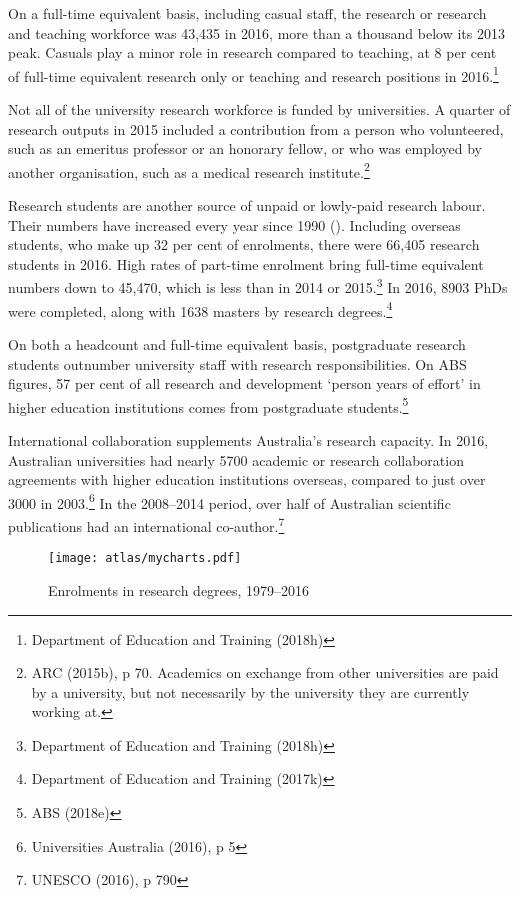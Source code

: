 \documentclass{grattan}
\begin{document}
On a full-time equivalent basis, including casual staff, the research or research and teaching workforce was 43,435 in 2016, more than a thousand below its 2013 peak. Casuals play a minor role in research compared to teaching, at 8 per cent of full-time equivalent research only or teaching and research positions in 2016.\footnote{Department of Education and Training (2018h)}

Not all of the university research workforce is funded by universities. A quarter of research outputs in 2015 included a contribution from a person who volunteered, such as an emeritus professor or an honorary fellow, or who was employed by another organisation, such as a medical research institute.\footnote{ARC (2015b), p 70. Academics on exchange from other universities are paid by a university, but not necessarily by the university they are currently working at.}

Research students are another source of unpaid or lowly-paid research labour. Their numbers have increased every year since 1990 (). Including overseas students, who make up 32 per cent of enrolments, there were 66,405 research students in 2016. High rates of part-time enrolment bring full-time equivalent numbers down to 45,470, which is less than in 2014 or 2015.\footnote{Department of Education and Training (2018h)} In 2016, 8903 PhDs were completed, along with 1638 masters by research degrees.\footnote{Department of Education and Training (2017k)}

On both a headcount and full-time equivalent basis, postgraduate research students outnumber university staff with research responsibilities. On ABS figures, 57 per cent of all research and development `person years of effort' in higher education institutions comes from postgraduate students.\footnote{ABS (2018e)}

International collaboration supplements Australia's research capacity. In 2016, Australian universities had nearly 5700 academic or research collaboration agreements with higher education institutions overseas, compared to just over 3000 in 2003.\footnote{Universities Australia (2016), p 5} In the 2008--2014 period, over half of Australian scientific publications had an international co-author.\footnote{UNESCO (2016), p 790}


    \begin{figure} %
    \caption{Enrolments in research degrees, 1979--2016}\label{fig:enrolments-in-research-degrees-19792016}
    \texttt{[image: atlas/mycharts.pdf]}
    \end{figure}
\end{document}
